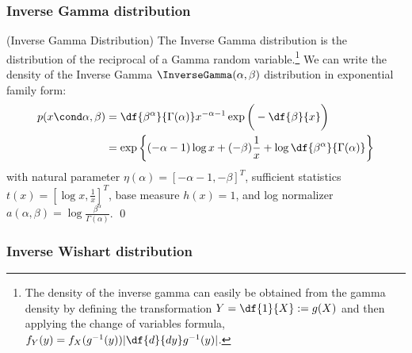 \documentclass{article} %
\begin{document}
\subsubsection{Inverse Gamma distribution}

\begin{example}{(Inverse Gamma Distribution)} 
\label{ex:inverse_gamma_as_ef} The Inverse Gamma distribution is the distribution of the reciprocal of a Gamma random variable.\footnote{The density of the inverse gamma can easily be obtained from the gamma density by defining the transformation $Y = \df{1}{X} := g(X)$ and then applying the change of variables formula,  $f_Y(y) = f_X (g^{-1}(y)) | \df{d}{dy} g^{-1}(y)|$.}  We can write the density of the Inverse Gamma $\InverseGamma(\alpha,  \beta)$ distribution in exponential family form:
\begin{align*}
p (x \cond \alpha,  \beta) &= \df{\beta^\alpha}{ \Gamma (\alpha) } x^{-\alpha -1} \exp \bigg(- \df{\beta}{x} \bigg) \\
&= \exp \bigg\{ (-\alpha - 1) \log x + (- \beta) \frac{1}{x} + \log \df{\beta^\alpha}{\Gamma(\alpha)} \bigg\}
\end{align*}
with natural parameter $\eta(\alpha) = [-\alpha-1,  -\beta]^T$, sufficient statistics $t(x) = [\log x ,  \frac{1}{x}]^T$, base measure $h(x)=1$, and log normalizer $a(\alpha,  \beta) =  \log \frac{\beta^\alpha}{\Gamma(\alpha)} $. 
\qed 
\end{example} 

\subsubsection{Inverse Wishart distribution}
\end{document}
